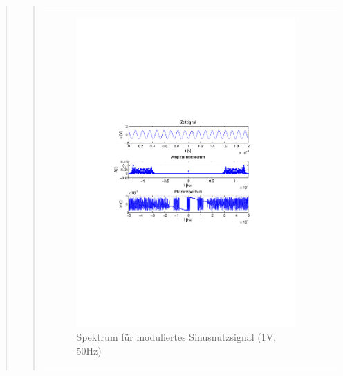 \begin{quote}
\begin{quote}
\begin{center}
\begin{tabular}{ll}
\begin{minipage}{0.6\textwidth}
                \end{minipage}
                \begin{minipage}{0.6\textwidth}

                     \begin{figure}[H]
                        \label{fig:}
                        \includegraphics[scale=0.5, trim = 2cm 6.5cm 1.5cm
                        8.5cm, clip]{./Bilder/sin_a1_f50}
                        \caption{Spektrum für moduliertes Sinusnutzsignal (1V,
                        50Hz)}
                    \end{figure}
               \vspace{-1.5em}

                \end{minipage}


\end{tabular}
\end{center}
\end{quote}
\end{quote}
